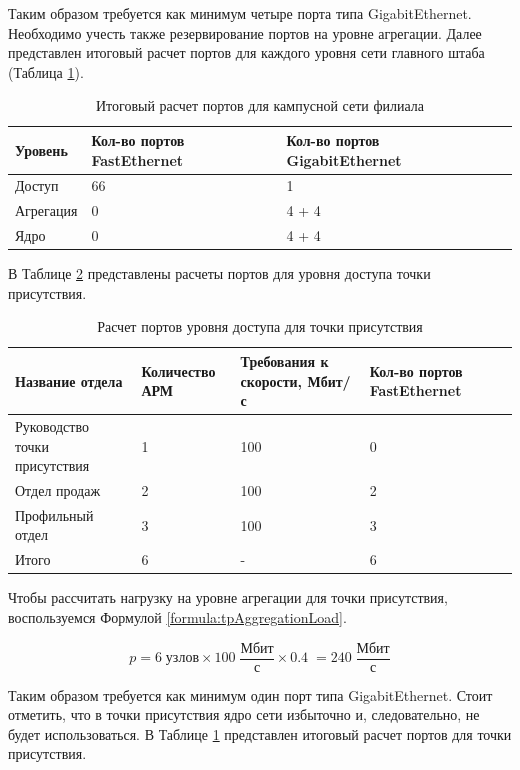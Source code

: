 \documentclass[14pt, a4paper]{extarticle}
\numberwithin{equation}{section}
\begin{document}
Таким образом требуется как минимум четыре порта типа GigabitEthernet.
Необходимо учесть также резервирование портов на уровне агрегации.
Далее представлен итоговый расчет портов для каждого уровня сети
главного штаба (Таблица \ref{table:filialCampusNet}). 

\begin{table}[H]
\centering
\small
\caption{Итоговый расчет портов для кампусной сети филиала}
\begin{tabular}{|m{2cm}|m{4cm}|m{3cm}|m{3.5cm}|}
\hline
\textbf{Уровень} & \textbf{Кол-во портов FastEthernet} & \textbf{Кол-во портов GigabitEthernet} \\
\hline
Доступ & 66 & 1 \\
\hline
Агрегация & 0 & 4 + 4 \\
\hline
Ядро & 0 & 4 + 4 \\
\hline
\end{tabular}
\label{table:filialCampusNet}
\end{table}

В Таблице \ref{table:tpAccessLevel} представлены расчеты портов для уровня доступа 
точки присутствия.

\begin{table}[H]
\centering
\small
\caption{Расчет портов уровня доступа для точки присутствия}
\begin{tabular}{|m{4cm}|m{2.5cm}|m{2.5cm}|m{2.5cm}|m{3cm}|}
\hline
\textbf{Название отдела} & \textbf{Количество АРМ} & \textbf{Требования к скорости, Мбит/с} & \textbf{Кол-во портов FastEthernet} \\
\hline
Руководство точки присутствия & 1 & 100 & 0 \\
\hline
Отдел продаж & 2 & 100 & 2 \\
\hline
Профильный отдел & 3 & 100 & 3 \\
\hline
Итого & 6 & - & 6 \\
\hline
\end{tabular}
\label{table:tpAccessLevel}
\end{table}

Чтобы рассчитать нагрузку на уровне агрегации для 
точки присутствия, воспользуемся Формулой \ref{formula:tpAggregationLoad}.

\begin{equation}
p = 6 \; \text{узлов} \times 100\;\frac{\text{Мбит}}{\text{с}} \times 0.4 \; = 240 \;\frac{\text{Мбит}}{\text{с}}
\label{formula:tpAggregationLoad}
\end{equation}


Таким образом требуется как минимум один порт типа GigabitEthernet.
Стоит отметить, что в точки присутствия ядро сети избыточно и, 
следовательно, не будет использоваться.
В Таблице \ref{table:filialCampusNet} представлен итоговый расчет портов для точки присутствия.
\end{document}
